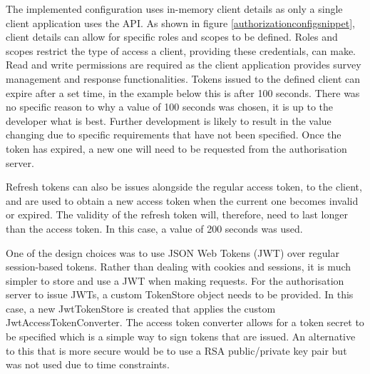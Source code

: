 The implemented configuration uses in-memory client details as only a single client application uses the API.
As shown in figure \ref{authorizationconfigsnippet}, client details can allow for specific roles and scopes to be defined.
Roles and scopes restrict the type of access a client, providing these credentials, can make.
Read and write permissions are required as the client application provides survey management and response functionalities.
Tokens issued to the defined client can expire after a set time, in the example below this is after 100 seconds.
There was no specific reason to why a value of 100 seconds was chosen, it is up to the developer what is best.
Further development is likely to result in the value changing due to specific requirements that have not been specified.
Once the token has expired, a new one will need to be requested from the authorisation server.

Refresh tokens can also be issues alongside the regular access token, to the client, and are used to obtain a new access token when the current one becomes invalid or expired. 
The validity of the refresh token will, therefore, need to last longer than the access token.
In this case, a value of 200 seconds was used. 

One of the design choices was to use JSON Web Tokens (JWT) over regular session-based tokens.
Rather than dealing with cookies and sessions, it is much simpler to store and use a JWT when making requests.
For the authorisation server to issue JWTs, a custom TokenStore object needs to be provided.
In this case, a new JwtTokenStore is created that applies the custom JwtAccessTokenConverter.
The access token converter allows for a token secret to be specified which is a simple way to sign tokens that are issued.
An alternative to this that is more secure would be to use a RSA public/private key pair but was not used due to time constraints.

